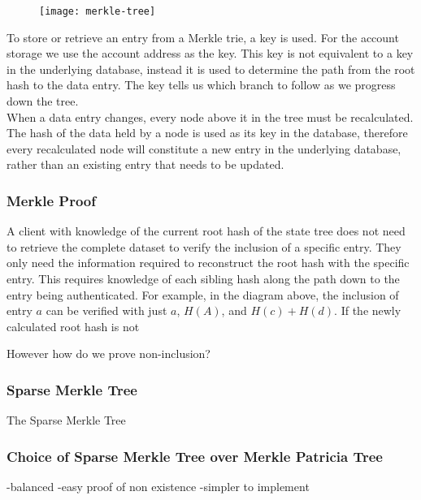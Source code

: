 \begin{figure}[h]
  \centering
\texttt{[image: merkle-tree]}
\end{figure}

To store or retrieve an entry from a Merkle trie, a key is used. For the account storage we use the account address as the key. This key is not equivalent to a key in the underlying database, instead it is used to determine the path from the root hash to the data entry. The key tells us which branch to follow as we progress down the tree. \\

When a data entry changes, every node above it in the tree must be recalculated. The hash of the data held by a node is used as its key in the database, therefore every recalculated node will constitute a new entry in the underlying database, rather than an existing entry that needs to be updated.\\

\subsubsection{Merkle Proof}

A client with knowledge of the current root hash of the state tree does not need to retrieve the complete dataset to verify the inclusion of a specific entry. They only need the information required to reconstruct the root hash with the specific entry. This requires knowledge of each sibling hash along the path down to the entry being authenticated. For example, in the diagram above, the inclusion of entry $a$ can be verified with just $a$, $H(A)$, and $H(c)+H(d)$. If the newly calculated root hash is not 

However how do we prove non-inclusion?

\subsubsection{Sparse Merkle Tree}

The Sparse Merkle Tree 


\subsubsection{Choice of Sparse Merkle Tree over Merkle Patricia Tree}

-balanced
-easy proof of non existence
-simpler to implement

